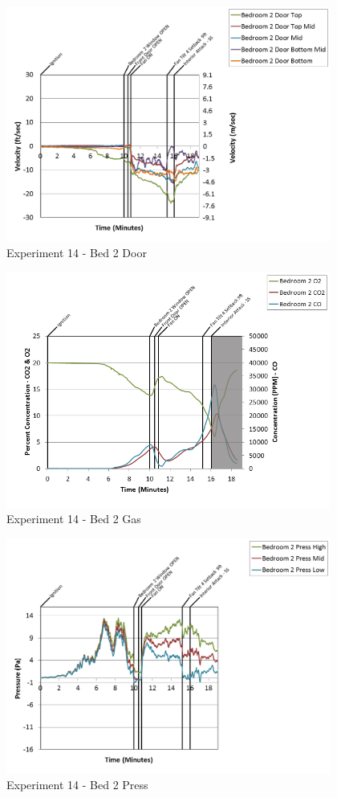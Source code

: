 \documentclass{article}
\begin{document}
\begin{appendices}
\begin{figure}[h!]
	\centering
	\includegraphics[height=3.05in]{0_Images/Results_Charts/Exp_14_Charts/Bed2Door.png}
	\caption{Experiment 14 - Bed 2 Door}
\end{figure}

\clearpage

\begin{figure}[h!]
	\centering
	\includegraphics[height=3.05in]{0_Images/Results_Charts/Exp_14_Charts/Bed2Gas.png}
	\caption{Experiment 14 - Bed 2 Gas}
\end{figure}


\begin{figure}[h!]
	\centering
	\includegraphics[height=3.05in]{0_Images/Results_Charts/Exp_14_Charts/Bed2Press.png}
	\caption{Experiment 14 - Bed 2 Press}
\end{figure}


\end{appendices}
\end{document}

